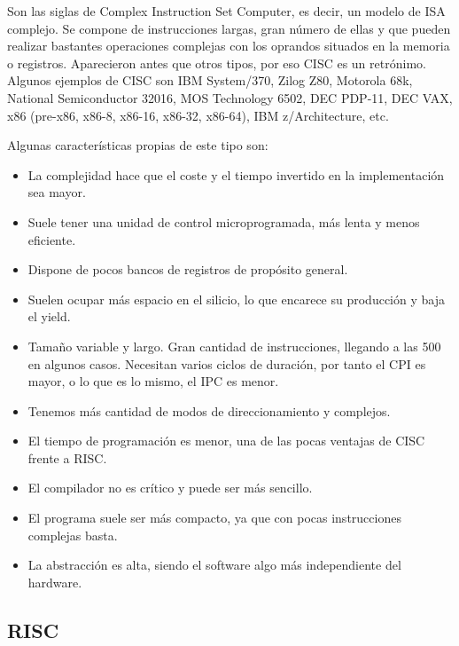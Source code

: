 \documentclass[a4paper, 11pt, titlepage]{article}
\begin{document}
        Son las siglas de Complex Instruction Set Computer, es decir, un modelo de 
        ISA complejo. Se compone de instrucciones largas, gran número de ellas y que pueden realizar 
        bastantes operaciones complejas con los oprandos situados en la memoria o registros. Aparecieron 
        antes que otros tipos, por eso CISC es un retrónimo. Algunos ejemplos de CISC son IBM System/370, 
        Zilog Z80, Motorola 68k, National Semiconductor 32016, MOS Technology 6502, DEC PDP-11, DEC VAX, 
        x86 (pre-x86, x86-8, x86-16, x86-32, x86-64), IBM z/Architecture, etc.

        Algunas características propias de este tipo son:

        \begin{itemize}
            \item La complejidad hace que el coste y el tiempo invertido en la implementación sea mayor.
            \item Suele tener una unidad de control microprogramada, más lenta y menos eficiente.
            \item Dispone de pocos bancos de registros de propósito general.
            \item Suelen ocupar más espacio en el silicio, lo que encarece su producción y baja el yield.
            \item Tamaño variable y largo. Gran cantidad de instrucciones, llegando a las 500 en algunos casos. 
            Necesitan varios ciclos de duración, por tanto el CPI es mayor, o lo que es lo mismo, el IPC es menor.
            \item Tenemos más cantidad de modos de direccionamiento y complejos.
            \item El tiempo de programación es menor, una de las pocas ventajas de CISC frente a RISC.
            \item El compilador no es crítico y puede ser más sencillo.
            \item El programa suele ser más compacto, ya que con pocas instrucciones complejas basta.
            \item La abstracción es alta, siendo el software algo más independiente del hardware.
        \end{itemize}

    \subsection{RISC}\label{risc}
    
\end{document}
